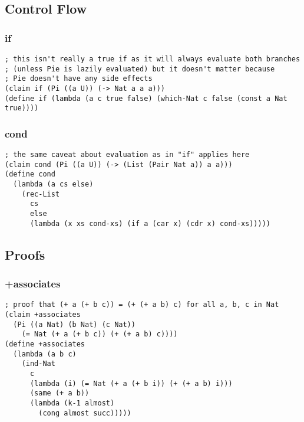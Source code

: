\subsection{Control Flow}

\subsubsection{if} \label{code:if}
\begin{verbatim}
; this isn't really a true if as it will always evaluate both branches
; (unless Pie is lazily evaluated) but it doesn't matter because
; Pie doesn't have any side effects 
(claim if (Pi ((a U)) (-> Nat a a a)))
(define if (lambda (a c true false) (which-Nat c false (const a Nat true))))
\end{verbatim}

\subsubsection{cond} \label{code:cond}
\begin{verbatim}
; the same caveat about evaluation as in "if" applies here
(claim cond (Pi ((a U)) (-> (List (Pair Nat a)) a a)))
(define cond
  (lambda (a cs else)
    (rec-List
      cs
      else
      (lambda (x xs cond-xs) (if a (car x) (cdr x) cond-xs)))))
\end{verbatim}


\subsection{Proofs}

\subsubsection{+associates} \label{code:+associates}
\begin{verbatim}
; proof that (+ a (+ b c)) = (+ (+ a b) c) for all a, b, c in Nat
(claim +associates
  (Pi ((a Nat) (b Nat) (c Nat))
    (= Nat (+ a (+ b c)) (+ (+ a b) c))))
(define +associates
  (lambda (a b c)
    (ind-Nat
      c
      (lambda (i) (= Nat (+ a (+ b i)) (+ (+ a b) i)))
      (same (+ a b))
      (lambda (k-1 almost)
        (cong almost succ)))))
\end{verbatim}

